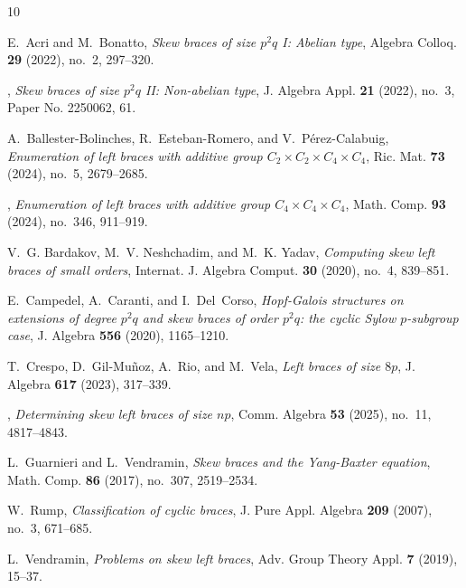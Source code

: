 \documentclass[12pt]{amsart}
\theoremstyle{definition}
\begin{document}
\begin{thebibliography}{10}

E.~Acri and M.~Bonatto, \emph{Skew braces of size {$p^2q$} {I}: {A}belian
  type}, Algebra Colloq. \textbf{29} (2022), no.~2, 297--320. %

\bysame, \emph{Skew braces of size {$p^2q$} {II}: {N}on-abelian type}, J.
  Algebra Appl. \textbf{21} (2022), no.~3, Paper No. 2250062, 61. %

A.~Ballester-Bolinches, R.~Esteban-Romero, and V.~P\'erez-Calabuig,
  \emph{Enumeration of left braces with additive group {$C_2\times C_2\times
  C_4\times C_4$}}, Ric. Mat. \textbf{73} (2024), no.~5, 2679--2685.

\bysame, \emph{Enumeration of left braces with additive group {$C_4\times
  C_4\times C_4$}}, Math. Comp. \textbf{93} (2024), no.~346, 911--919.

V.~G. Bardakov, M.~V. Neshchadim, and M.~K. Yadav, \emph{Computing skew left
  braces of small orders}, Internat. J. Algebra Comput. \textbf{30} (2020),
  no.~4, 839--851. %

E.~Campedel, A.~Caranti, and I.~Del~Corso, \emph{Hopf-{G}alois structures on
  extensions of degree {$p^2q$} and skew braces of order {$p^2 q$}: the cyclic
  {S}ylow {$p$}-subgroup case}, J. Algebra \textbf{556} (2020), 1165--1210.

T.~Crespo, D.~Gil-Mu\~noz, A.~Rio, and M.~Vela, \emph{Left braces of size
  {$8p$}}, J. Algebra \textbf{617} (2023), 317--339. %

\bysame, \emph{Determining skew left braces of size {$np$}}, Comm. Algebra
  \textbf{53} (2025), no.~11, 4817--4843. %

L.~Guarnieri and L.~Vendramin, \emph{Skew braces and the {Y}ang-{B}axter
  equation}, Math. Comp. \textbf{86} (2017), no.~307, 2519--2534. %

W.~Rump, \emph{Classification of cyclic braces}, J. Pure Appl. Algebra
  \textbf{209} (2007), no.~3, 671--685. %

L.~Vendramin, \emph{Problems on skew left braces}, Adv. Group Theory Appl.
  \textbf{7} (2019), 15--37. %

\end{thebibliography}
\end{document}
